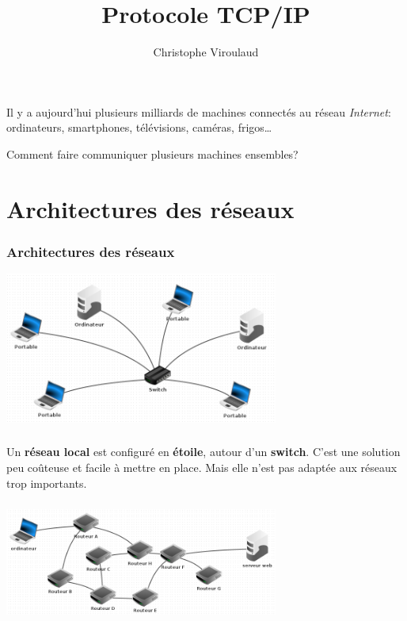 \documentclass[svgnames,11pt]{beamer}
\author[]{Christophe Viroulaud}
\title{Protocole TCP/IP}
\date{\framebox{\textbf{ArchMat 11}}}
\institute{ Première - NSI }
\begin{document}
\begin{frame}
    \titlepage
\end{frame}
\begin{frame}
    \frametitle{}

    Il y a aujourd'hui plusieurs milliards de machines connectés au réseau \emph{Internet}: ordinateurs, smartphones, télévisions, caméras, frigos\dots
    \begin{framed}
        \centering Comment faire communiquer plusieurs machines ensembles?
    \end{framed}
\end{frame}
\section{Architectures des réseaux}
\begin{frame}
    \frametitle{Architectures des réseaux}

    \begin{center}
        \centering
        \includegraphics[width=9cm]{ressources/local.png}
        \label{IMG}
    \end{center}

\end{frame}
\begin{frame}
    \frametitle{}
    \begin{aretenir}[]
        Un \textbf{réseau local} est configuré en \textbf{étoile}, autour d'un \textbf{switch}. C'est une solution peu coûteuse et facile à mettre en place. Mais elle n'est pas adaptée aux réseaux trop importants.
    \end{aretenir}


\end{frame}
\begin{frame}
    \frametitle{}

    \begin{center}
        \centering
        \includegraphics[width=9cm]{ressources/maille.png}
        \label{IMG}
    \end{center}

\end{frame}
\end{document}
